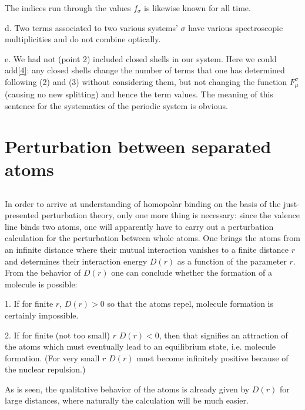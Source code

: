 \begin{paper}{1}
The indices run through the values
$f_\sigma$ is likewise known for all time.

d. Two terms associated to two various systems' $\sigma$ have various spectroscopic multiplicities and do not combine optically.

e. We had not (point 2) included closed shells in our system. Here we could add\ref{4}: any closed shells change the number of terms that one has determined following (2) and (3) without considering them, but not changing the function $F_\mu^\sigma$ (causing no new splitting) and hence the term values. The meaning of this sentence for the systematics of the periodic system is obvious.

\section{Perturbation between separated atoms}
\subsection{}
In order to arrive at understanding of homopolar binding on the basis of the just-presented perturbation theory, only one more thing is necessary: since the valence line binds two atoms, one will apparently have to carry out a perturbation calculation for the perturbation between whole atoms. One brings the atoms from an infinite distance where their mutual interaction vanishes to a finite distance $r$ and determines their interaction energy $D(r)$ as a function of the parameter $r$. From the behavior of $D(r)$ one can conclude whether the formation of a molecule is possible:

1. If for finite $r$, $D(r)>0$ so that the atoms repel, molecule formation is certainly impossible.

2. If for finite (not too small) $r$ $D(r)<0$, then that signifies an attraction of the atoms which must eventually lead to an equilibrium state, i.e. molecule formation. (For very small $r$ $D(r)$ must become infinitely positive because of the nuclear repulsion.)

As is seen, the qualitative behavior of the atoms is already given by $D(r)$ for large distances, where naturally the calculation will be much easier.


\end{paper}
